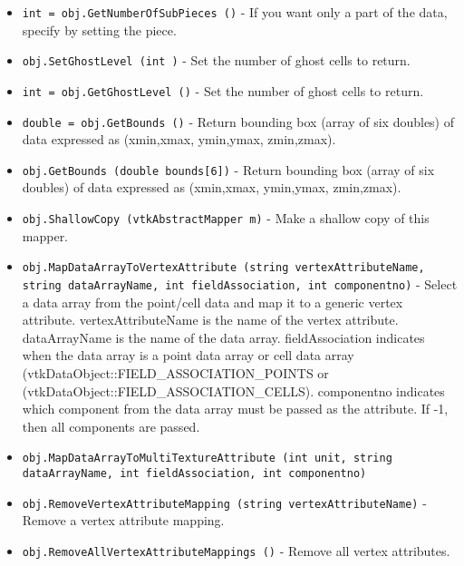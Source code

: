 \begin{itemize}
\item  \verb|int = obj.GetNumberOfSubPieces ()| -  If you want only a part of the data, specify by setting the piece.

\item  \verb|obj.SetGhostLevel (int )| -  Set the number of ghost cells to return.

\item  \verb|int = obj.GetGhostLevel ()| -  Set the number of ghost cells to return.

\item  \verb|double = obj.GetBounds ()| -  Return bounding box (array of six doubles) of data expressed as
 (xmin,xmax, ymin,ymax, zmin,zmax).

\item  \verb|obj.GetBounds (double bounds[6])| -  Return bounding box (array of six doubles) of data expressed as
 (xmin,xmax, ymin,ymax, zmin,zmax).

\item  \verb|obj.ShallowCopy (vtkAbstractMapper m)| -  Make a shallow copy of this mapper.

\item  \verb|obj.MapDataArrayToVertexAttribute (string vertexAttributeName, string dataArrayName, int fieldAssociation, int componentno)| -  Select a data array from the point/cell data
 and map it to a generic vertex attribute. 
 vertexAttributeName is the name of the vertex attribute.
 dataArrayName is the name of the data array.
 fieldAssociation indicates when the data array is a point data array or
 cell data array (vtkDataObject::FIELD\_ASSOCIATION\_POINTS or
 (vtkDataObject::FIELD\_ASSOCIATION\_CELLS).
 componentno indicates which component from the data array must be passed as
 the attribute. If -1, then all components are passed.

\item  \verb|obj.MapDataArrayToMultiTextureAttribute (int unit, string dataArrayName, int fieldAssociation, int componentno)|

\item  \verb|obj.RemoveVertexAttributeMapping (string vertexAttributeName)| -  Remove a vertex attribute mapping.

\item  \verb|obj.RemoveAllVertexAttributeMappings ()| -  Remove all vertex attributes.

\end{itemize}
